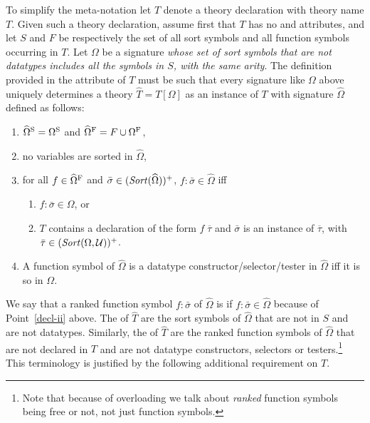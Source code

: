 To simplify the meta-notation let $T$ denote 
a theory declaration with theory name $T$.
Given such a theory declaration,
assume first that $T$ has no  and
 attributes,
and
let $S$ and $F$ be respectively the set of all sort symbols and 
all function symbols occurring in $T$.
Let $\Omega$ be a signature
\emph{whose set of sort symbols that are not datatypes
includes all the symbols in $S$, with the same arity}.
The definition provided in the  attribute of $T$
must be such that
every signature like $\Omega$ above uniquely determines 
a theory $\widehat T = T[\Omega]$ as an instance of $T$
with signature $\widehat\Omega$ defined as follows:
\begin{enumerate}
\item
$\widehat\Omega^\mathrm{S} = \Omega^\mathrm{S}$
and
$\widehat\Omega^\mathrm{F} = F \cup \Omega^\mathrm{F}$,

\item
no variables are sorted in $\widehat\Omega$,

\item
for all $f \in \widehat\Omega^\mathrm{F}$ and 
$\bar{\sigma} \in (\mathit{Sort}(\widehat\Omega))^+$, 
$f{:}\bar{\sigma} \in \widehat\Omega$ iff
\begin{enumerate}
\item
$f{:}\bar{\sigma} \in \Omega$, or

\item \label{decl-ii}
$T$ contains a declaration of the form $f\;\overline{\tau}$ and
$\bar{\sigma}$ is an instance of $\overline \tau$, with $\bar\tau\in (\mathit{Sort}(\Omega, \mathcal{U}))^+$.
\end{enumerate}

\item
A function symbol of $\widehat\Omega$ is a datatype constructor/selector/tester 
in $\widehat\Omega$ iff it is so in $\Omega$.
\end{enumerate}

We say that a ranked function symbol $f{:}\bar{\sigma}$ of $\widehat\Omega$ 
is  
if $f{:}\bar{\sigma} \in \widehat\Omega$
because of Point~\ref{decl-ii} above.
The  of $\widehat T$ are
the sort symbols of $\widehat\Omega$ that are not in $S$
and are not datatypes.
Similarly, the  of $\widehat T$
are the ranked function symbols of $\widehat\Omega$
that are not declared in $T$
and are not datatype constructors, selectors or testers.\footnote{%
Note that because of overloading 
we talk about \emph{ranked} function symbols being free or not,
not just function symbols.
}
This terminology is justified by the following additional requirement on $T$.

